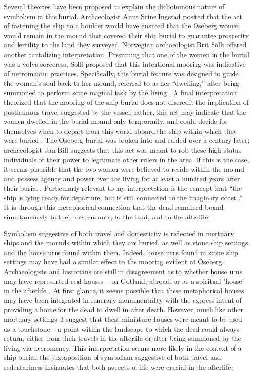 Several theories have been proposed to explain the dichotomous nature of symbolism in this burial. Archaeologist Anne Stine Ingstad posited that the act of fastening the ship to a boulder would have ensured that the Oseberg women would remain in the mound that covered their ship burial to guarantee prosperity and fertility to the land they surveyed. Norwegian archaeologist Brit Solli offered another tantalizing interpretation. Presuming that one of the women in the burial was a volva sorceress, Solli proposed that this intentional mooring was indicative of necromantic practices. Specifically, this burial feature was designed to guide the woman’s soul back to her mound, referred to as her “dwelling,” after being summoned to perform some magical task by the living \parencite[33]{Ruffoni_2011}.
A final interpretation theorized that the mooring of the ship burial does not discredit the implication of posthumous travel suggested by the vessel; rather, this act may indicate that the women dwelled in the burial mound only temporarily, and could decide for themselves when to depart from this world aboard the ship within which they were buried \parencite[216--217]{Bill_2016}.
The Oseberg burial was broken into and raided over a century later; archaeologist Jan Bill suggests that this act was meant to rob these high status individuals of their power to legitimate other rulers in the area. If this is the case, it seems plausible that the two women were believed to reside within the mound and possess agency and power over the living for at least a hundred years after their burial \parencite[218]{Bill_2016}.
Particularly relevant to my interpretation is the concept that “the ship is lying ready for departure, but is still connected to the imaginary coast \parencite[212]{Bill_2016}.” It is through this metaphorical connection that the dead remained bound simultaneously to their descendants, to the land, and to the afterlife.

Symbolism suggestive of both travel and domesticity is reflected in mortuary ships and the mounds within which they are buried, as well as stone ship settings and the house urns found within them. Indeed, house urns found in stone ship settings may have had a similar effect to the mooring evident at Oseberg. Archaeologists and historians are still in disagreement as to whether house urns may have represented real houses – on Gotland, abroad, or as a spiritual 'house' in the afterlife \parencite[80]{Runesson_2010}. At first glance, it seems possible that these metaphorical houses may have been integrated in funerary monumentality with the express intent of providing a home for the dead to dwell in after death. However, much like other mortuary settings, I suggest that these miniature houses were meant to be used as a touchstone – a point within the landscape to which the dead could always return, either from their travels in the afterlife or after being summoned by the living via necromancy. This interpretation seems more likely in the context of a ship burial; the juxtaposition of symbolism suggestive of both travel and sedentariness insinuates that both aspects of life were crucial in the afterlife.

